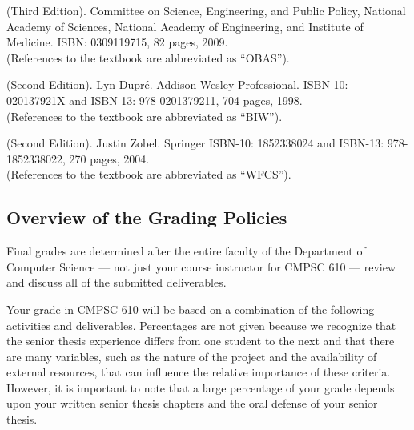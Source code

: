 \documentclass[11pt]{article}
\begin{document}
(Third Edition).  Committee on Science, Engineering, and Public Policy, National
Academy of Sciences, National Academy of Engineering, and Institute of Medicine.
ISBN: 0309119715, 82 pages, 2009.\\ (References to the textbook are abbreviated
as ``OBAS'').

\vspace*{.1in}

 (Second
Edition). Lyn Dupr\'e.  Addison-Wesley Professional.  ISBN-10: 020137921X and
ISBN-13: 978-0201379211, 704 pages, 1998.\\ (References to the textbook are
abbreviated as ``BIW'').

\vspace*{.1in}

 (Second Edition).  Justin Zobel.
Springer ISBN-10: 1852338024 and ISBN-13: 978-1852338022, 270 pages, 2004. \\
(References to the textbook are abbreviated as ``WFCS'').

\subsection*{Overview of the Grading Policies}

Final grades are determined after the entire faculty of the Department of
Computer Science --- not just your course instructor for CMPSC 610 --- review
and discuss all of the submitted deliverables.

Your grade in CMPSC 610 will be based on a combination of the following
activities and deliverables. Percentages are not given because we recognize
that the senior thesis experience differs from one student to the next and that
there are many variables, such as the nature of the project and the
availability of external resources, that can influence the relative importance
of these criteria. However, it is important to note that a large percentage of
your grade depends upon your written senior thesis chapters and the oral
defense of your senior thesis.
\end{document}
